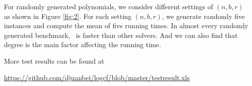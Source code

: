 %
%
%
%
%
%
%
%
%
%
%



For randomly generated polynomials, we consider different settings of
$(n,b,r)$ as shown in Figure \ref{fig:2}. For each setting $(n,b,r)$, we generate randomly five instances and  compute the mean of five running times.  In almost every randomly generated benchmark, \froot\  is  faster than other  solvers. And we can also  find that
degree is the main factor affecting the  running time.

More test results can be found at
	
	 \url{https://github.com/djuanbei/logcf/blob/master/testresult.xls}

